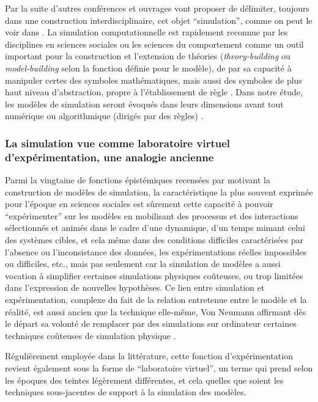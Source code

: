 Par la suite d'autres conférences et ouvrages vont proposer de délimiter, toujours dans une construction interdisciplinaire, cet objet \enquote{simulation}, comme on peut le voir dans \autocites{Guetzkow1962, Borko1962, Guetzkow1972, Dutton1971}. La simulation computationnelle est rapidement reconnue par les disciplines en sciences sociales ou les sciences du comportement comme un outil important pour la construction et l'extension de théories (\textit{theory-building} ou \textit{model-building} selon la fonction définie pour le modèle), de par sa capacité à manipuler certes des symboles mathématiques, mais aussi des symboles de plus haut niveau d'abstraction, propre à l'établissement de règle \autocite[924-925]{Clarkson1960}. Dans notre étude, les modèles de simulation seront évoqués dans leurs dimensions avant tout numérique ou algorithmique (dirigés par des règles) \autocite[36-38]{Varenne2013b}.

\subsubsection{La simulation vue comme laboratoire virtuel d'expérimentation, une analogie ancienne}
\label{ssec:labo_virtuelle}

Parmi la vingtaine de fonctions épistémiques recensées par \textcite[14-23]{Varenne2013b} motivant la construction de modèles de simulation, la caractéristique la plus souvent exprimée pour l'époque en sciences sociales est sûrement cette capacité à pouvoir \enquote{expérimenter} sur les modèles en mobilisant des processus et des interactions sélectionnés et animés dans le cadre d'une dynamique, d'un temps mimant celui des systèmes cibles, et cela même dans des conditions difficiles caractérisées par l'absence ou l'inconsistance des données, les expérimentations réelles impossibles ou difficiles, etc., mais pas seulement car la simulation de modèles a aussi vocation à simplifier certaines simulations physiques coûteuses, ou trop limitées dans l'expression de nouvelles hypothèses. Ce lien entre simulation et expérimentation, complexe du fait de la relation entretenue entre le modèle et la réalité, est aussi ancien que la technique elle-même, Von Neumann affirmant dès le départ sa volonté de remplacer par des simulations sur ordinateur certaines techniques coûteuses de simulation physique \autocite[15]{Winsberg2013}.

Régulièrement employée dans la littérature, cette fonction d’expérimentation revient également sous la forme de \enquote{laboratoire virtuel}, un terme qui prend selon les époques des teintes légèrement différentes, et cela quelles que soient les techniques sous-jacentes de support à la simulation des modèles.

